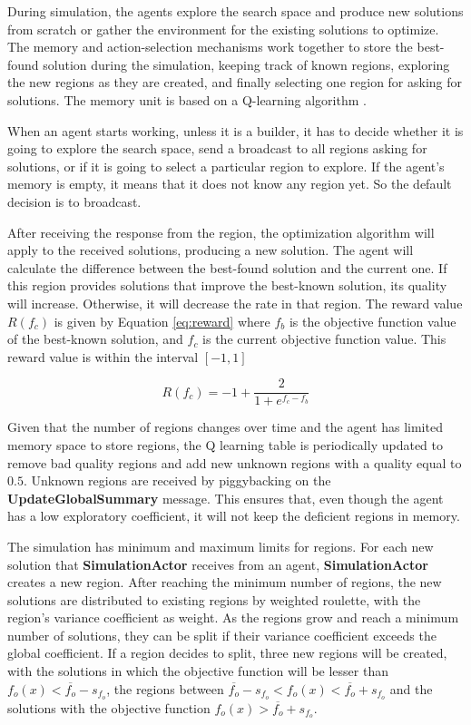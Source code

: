 \documentclass[preprint,12pt]{elsarticle}
\begin{document}
During simulation, the agents explore the search space and produce new solutions from scratch or gather the environment for the existing solutions to optimize. The memory and action-selection mechanisms work together to store the best-found solution during the simulation, keeping track of known regions, exploring the new regions as they are created, and finally selecting one region for asking for solutions. The memory unit is based on a Q-learning algorithm \cite{hasselt2010qlearning}.

When an agent starts working, unless it is a builder, it has to decide whether it is going to explore the search space, send a broadcast to all regions asking for solutions, or if it is going to select a particular region to explore. If the agent's memory is empty, it means that it does not know any region yet. So the default decision is to broadcast. 

After receiving the response from the region, the optimization algorithm will apply to the received solutions, producing a new solution. The agent will calculate the difference between the best-found solution and the current one. If this region provides solutions that improve the best-known solution, its quality will increase. Otherwise, it will decrease the rate in that region. The reward value $R(f_c)$ is given by Equation \ref{eq:reward} where $f_b$ is the objective function value of the best-known solution, and $f_c$ is the current objective function value. This reward value is within the interval $[-1, 1]$

\begin{equation}
\label{eq:reward}
    R(f_c) = -1 + \frac{2}{1 + e^{f_c - f_b}}
\end{equation}

Given that the number of regions changes over time and the agent has limited memory space to store regions, the Q learning table is periodically updated to remove bad quality regions and add new unknown regions with a quality equal to $0.5$. Unknown regions are received by piggybacking on the \textbf{UpdateGlobalSummary} message. This ensures that, even though the agent has a low exploratory coefficient, it will not keep the deficient regions in memory.

The simulation has minimum and maximum limits for regions. For each new solution that \textbf{SimulationActor} receives from an agent, \textbf{ SimulationActor } creates a new region. After reaching the minimum number of regions, the new solutions are distributed to existing regions by weighted roulette, with the region's variance coefficient as weight. As the regions grow and reach a minimum number of solutions, they can be split if their variance coefficient exceeds the global coefficient. If a region decides to split, three new regions will be created, with the solutions in which the objective function will be lesser than $f_o(x) < \overline{f_o} - s_{f_o}$, the regions between $\overline{f_o} - s_{f_o} < f_o(x) < \overline{f_o} + s_{f_o}$  and the solutions with the objective function $f_o(x) > \overline{f_o} + s_{f_o}$.
\end{document}
